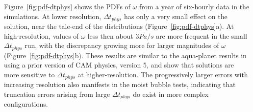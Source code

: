 \documentclass{agujournal}
\begin{document}
Figure~\ref{fig:pdf-dtphys} shows the PDFs of $\omega$ from a year of six-hourly data in the simulations. At lower resolution, $\Delta t_{phys}$ has only a very small effect on the solution, near the tale-end of the distributions (Figure~\ref{fig:pdf-dtphys}a). At high-resolution, values of $\omega$ less then about $3 Pa/s$ are more frequent in the small $\Delta t_{phys}$ run, with the discrepancy growing more for larger magnitudes of $\omega$ (Figure~\ref{fig:pdf-dtphys}b). These results are similar to the aqua-planet results in \cite{HR2018JAMES} using a prior version of CAM physics, version 5, and show that solutions are more sensitive to $\Delta t_{phys}$ at higher-resolution. The progressively larger errors with increasing resolution also manifests in the moist bubble tests, indicating that truncation errors arising from large $\Delta t_{phys}$ do exist in more complex configurations.


%
%
%
%
%
%
%







\end{document}
